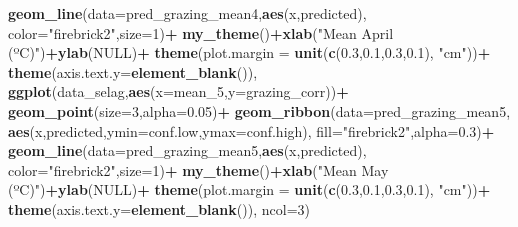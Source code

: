 \documentclass[
]{article}
\newenvironment{Shaded}{\begin{snugshade}}{\end{snugshade}}
\newcommand{\DataTypeTok}[1]{\textcolor[rgb]{0.13,0.29,0.53}{#1}}
\newcommand{\DecValTok}[1]{\textcolor[rgb]{0.00,0.00,0.81}{#1}}
\newcommand{\FloatTok}[1]{\textcolor[rgb]{0.00,0.00,0.81}{#1}}
\newcommand{\KeywordTok}[1]{\textcolor[rgb]{0.13,0.29,0.53}{\textbf{#1}}}
\newcommand{\NormalTok}[1]{#1}
\newcommand{\OperatorTok}[1]{\textcolor[rgb]{0.81,0.36,0.00}{\textbf{#1}}}
\newcommand{\OtherTok}[1]{\textcolor[rgb]{0.56,0.35,0.01}{#1}}
\newcommand{\StringTok}[1]{\textcolor[rgb]{0.31,0.60,0.02}{#1}}
\begin{document}
\begin{Shaded}
\begin{Highlighting}[]
\StringTok{    }\KeywordTok{geom\_line}\NormalTok{(}\DataTypeTok{data=}\NormalTok{pred\_grazing\_mean4,}\KeywordTok{aes}\NormalTok{(x,predicted),}
              \DataTypeTok{color=}\StringTok{"firebrick2"}\NormalTok{,}\DataTypeTok{size=}\DecValTok{1}\NormalTok{)}\OperatorTok{+}
\StringTok{    }\KeywordTok{my\_theme}\NormalTok{()}\OperatorTok{+}\KeywordTok{xlab}\NormalTok{(}\StringTok{"Mean April (ºC)"}\NormalTok{)}\OperatorTok{+}\KeywordTok{ylab}\NormalTok{(}\OtherTok{NULL}\NormalTok{)}\OperatorTok{+}
\StringTok{    }\KeywordTok{theme}\NormalTok{(}\DataTypeTok{plot.margin =} \KeywordTok{unit}\NormalTok{(}\KeywordTok{c}\NormalTok{(}\FloatTok{0.3}\NormalTok{,}\FloatTok{0.1}\NormalTok{,}\FloatTok{0.3}\NormalTok{,}\FloatTok{0.1}\NormalTok{), }\StringTok{"cm"}\NormalTok{))}\OperatorTok{+}
\StringTok{    }\KeywordTok{theme}\NormalTok{(}\DataTypeTok{axis.text.y=}\KeywordTok{element\_blank}\NormalTok{()),}
  \KeywordTok{ggplot}\NormalTok{(data\_selag,}\KeywordTok{aes}\NormalTok{(}\DataTypeTok{x=}\NormalTok{mean\_}\DecValTok{5}\NormalTok{,}\DataTypeTok{y=}\NormalTok{grazing\_corr))}\OperatorTok{+}
\StringTok{    }\KeywordTok{geom\_point}\NormalTok{(}\DataTypeTok{size=}\DecValTok{3}\NormalTok{,}\DataTypeTok{alpha=}\FloatTok{0.05}\NormalTok{)}\OperatorTok{+}
\StringTok{    }\KeywordTok{geom\_ribbon}\NormalTok{(}\DataTypeTok{data=}\NormalTok{pred\_grazing\_mean5,}
                \KeywordTok{aes}\NormalTok{(x,predicted,}\DataTypeTok{ymin=}\NormalTok{conf.low,}\DataTypeTok{ymax=}\NormalTok{conf.high),}
                \DataTypeTok{fill=}\StringTok{"firebrick2"}\NormalTok{,}\DataTypeTok{alpha=}\FloatTok{0.3}\NormalTok{)}\OperatorTok{+}
\StringTok{    }\KeywordTok{geom\_line}\NormalTok{(}\DataTypeTok{data=}\NormalTok{pred\_grazing\_mean5,}\KeywordTok{aes}\NormalTok{(x,predicted),}
              \DataTypeTok{color=}\StringTok{"firebrick2"}\NormalTok{,}\DataTypeTok{size=}\DecValTok{1}\NormalTok{)}\OperatorTok{+}
\StringTok{    }\KeywordTok{my\_theme}\NormalTok{()}\OperatorTok{+}\KeywordTok{xlab}\NormalTok{(}\StringTok{"Mean May (ºC)"}\NormalTok{)}\OperatorTok{+}\KeywordTok{ylab}\NormalTok{(}\OtherTok{NULL}\NormalTok{)}\OperatorTok{+}
\StringTok{    }\KeywordTok{theme}\NormalTok{(}\DataTypeTok{plot.margin =} \KeywordTok{unit}\NormalTok{(}\KeywordTok{c}\NormalTok{(}\FloatTok{0.3}\NormalTok{,}\FloatTok{0.1}\NormalTok{,}\FloatTok{0.3}\NormalTok{,}\FloatTok{0.1}\NormalTok{), }\StringTok{"cm"}\NormalTok{))}\OperatorTok{+}
\StringTok{    }\KeywordTok{theme}\NormalTok{(}\DataTypeTok{axis.text.y=}\KeywordTok{element\_blank}\NormalTok{()),}
  \DataTypeTok{ncol=}\DecValTok{3}\NormalTok{)}
\end{Highlighting}
\end{Shaded}
\end{document}
